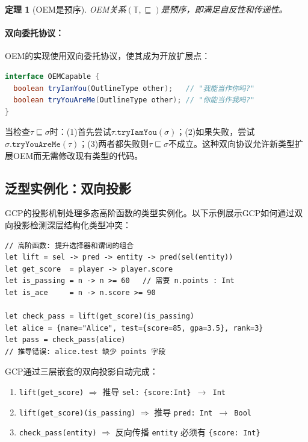 \documentclass[UTF8]{article}
\newtheorem{theorem}{定理}[section]
\begin{document}
\begin{theorem}[OEM是预序]
\label{thm:oem-preorder}
OEM关系$(\mathbb{T}, \sqsubseteq)$是预序，即满足自反性和传递性。
\end{theorem}

\paragraph{双向委托协议：}OEM的实现使用双向委托协议，使其成为开放扩展点：

\begin{lstlisting}[language=Java]
interface OEMCapable {
  boolean tryIamYou(OutlineType other);   // "我能当作你吗?"
  boolean tryYouAreMe(OutlineType other); // "你能当作我吗?"
}
\end{lstlisting}

当检查$\tau \sqsubseteq \sigma$时：(1)首先尝试$\tau.\texttt{tryIamYou}(\sigma)$；(2)如果失败，尝试$\sigma.\texttt{tryYouAreMe}(\tau)$；(3)两者都失败则$\tau \sqsubseteq \sigma$不成立。这种双向协议允许新类型扩展OEM而无需修改现有类型的代码。

\subsection{泛型实例化：双向投影}
\label{sec:projection}

GCP的投影机制处理多态高阶函数的类型实例化。以下示例展示GCP如何通过双向投影检测深层结构化类型冲突：

\begin{lstlisting}[language={}]
// 高阶函数: 提升选择器和谓词的组合
let lift = sel -> pred -> entity -> pred(sel(entity))
let get_score  = player -> player.score
let is_passing = n -> n >= 60   // 需要 n.points : Int
let is_ace     = n -> n.score >= 90

let check_pass = lift(get_score)(is_passing)
let alice = {name="Alice", test={score=85, gpa=3.5}, rank=3}
let pass = check_pass(alice)
// 推导错误: alice.test 缺少 points 字段
\end{lstlisting}

GCP通过三层嵌套的双向投影自动完成：
\begin{enumerate}[leftmargin=2em]
\item \texttt{lift(get\_score)} $\Rightarrow$ 推导 \texttt{sel: \{score:Int\} $\to$ Int}
\item \texttt{lift(get\_score)(is\_passing)} $\Rightarrow$ 推导 \texttt{pred: Int $\to$ Bool}
\item \texttt{check\_pass(entity)} $\Rightarrow$ 反向传播 \texttt{entity} 必须有 \texttt{\{score: Int\}}
\end{enumerate}
\end{document}
